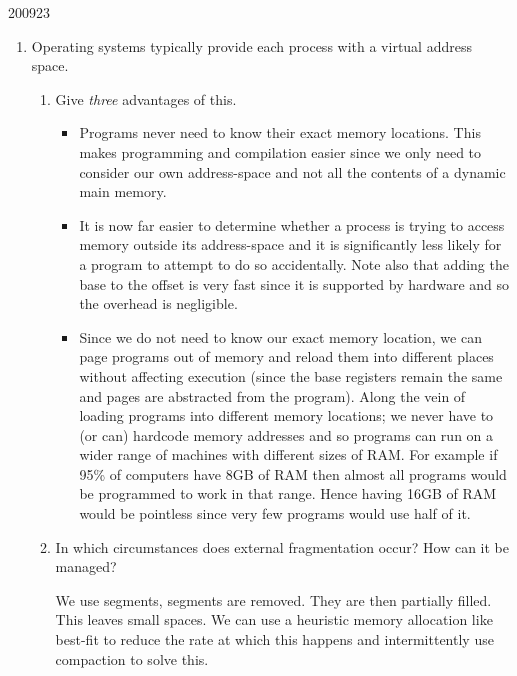 \documentclass[10pt,\jkfside,a4paper]{article}
\begin{document}
\begin{examquestion}{2009}{2}{3}

\begin{enumerate}

\item  Operating systems typically provide each process with a virtual address space.

\begin{enumerate}

\item Give \textit{three} advantages of this.

\begin{itemize}

\item Programs never need to know their exact memory locations. This makes programming 
and compilation easier since we only need to consider our own address-space and not all 
the contents of a dynamic main memory.

\item It is now far easier to determine whether a process is trying to access memory 
outside its address-space and it is significantly less likely for a program to attempt 
to do so accidentally. Note also that adding the base to the offset is very fast since it 
is supported by hardware and so the overhead is negligible.

\item Since we do not need to know our exact memory location, we can page programs out of 
memory and reload them into different places without affecting execution (since the base 
registers remain the same and pages are abstracted from the program). Along the vein of 
loading programs into different memory locations; we never have to (or can) hardcode memory 
addresses and so programs can run on a wider range of machines with different sizes of RAM. 
For example if 95\% of computers have 8GB of RAM then almost all programs would be programmed 
to work in that range. Hence having 16GB of RAM would be pointless since very few programs 
would use half of it.

\end{itemize}

\item In which circumstances does external fragmentation occur? How can it
be managed?

We use segments, segments are removed. They are then partially filled. This leaves small 
spaces. We can use a heuristic memory allocation like best-fit to reduce the rate at which 
this happens and intermittently use compaction to solve this.


\end{enumerate}
\end{enumerate}
\end{examquestion}
\end{document}
